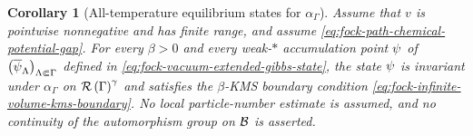 \documentclass[11pt,a4paper]{article}
\theoremstyle{plain}
\newtheorem{cor}[thm]{Corollary}
\theoremstyle{definition}
\theoremstyle{remark}
\begin{document}
\begin{cor}[All-temperature equilibrium states for $\alpha_{\Gamma}$]\label{cor:fock-all-temperature-kms-states}
Assume that $v$ is pointwise nonnegative and has finite range, and assume
\eqref{eq:fock-path-chemical-potential-gap}.
For every $\beta > 0$ and every weak-$\ast$ accumulation point $\oastate[\psi]$ of
$\seq{\oastate[\overline{\psi}_{\Lambda}]}{\Lambda \Subset \Gamma}$ defined in
\eqref{eq:fock-vacuum-extended-gibbs-state}, the state $\oastate[\psi]$ is invariant under
$\alpha_{\Gamma}$ on $\mathcal{R} \left( \Gamma \right)^{\gamma}$ and satisfies the $\beta$-KMS boundary
condition \eqref{eq:fock-infinite-volume-kms-boundary}.
No local particle-number estimate is assumed, and no continuity of the automorphism group on $\mathcal{B}$ is asserted.
\end{cor}
\end{document}
